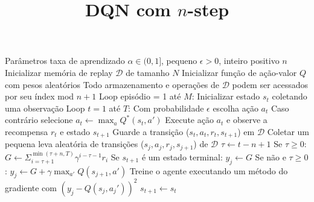 \documentclass[brazilian,preview]{standalone}
\title{DQN com $n$-step}
\begin{document}
\begin{algorithm}
Parâmetros taxa de aprendizado $\alpha  \in (0,1]$, pequeno $\epsilon > 0$, inteiro positivo $n$
Inicializar memória de replay $\mathcal{D}$ de tamanho $N$
Inicializar função de ação-valor $Q$ com pesos aleatórios
Todo armazenamento e operações de $\mathcal{D}$ podem ser acessados por seu índex mod $n+1$
Loop episódio = 1 até $M$:
    Inicializar estado $s_t$ coletando uma observação
    Loop $t = 1$ até $T$:
        Com probabilidade $\epsilon$ escolha ação $a_t$
        Caso contrário selecione $a_t \leftarrow \operatorname{max}_{a} Q^*(s_t, a')$
        Execute ação $a_t$ e observe a recompensa $r_t$ e estado $s_{t+1}$
        Guarde a transição ($s_t,a_t,r_t,s_{t+1}$) em $\mathcal{D}$
        Coletar um pequena leva aleatória de transições ($s_j,a_j,r_j,s_{j+1}$) de $\mathcal{D}$
        $\tau \leftarrow t - n + 1$
        Se $\tau \geq 0$:
            $G \leftarrow \Sigma_{i=\tau+1}^{\operatorname{min}(\tau+n,T)}\gamma^{i-\tau-1}r_i$
        Se $s_{t+1}$ é um estado terminal:
            $y_j \leftarrow G$
        Se não e $\tau \geq 0$:
            $y_j \leftarrow G + \gamma \operatorname{max}_{a'}Q(s_{j+1}, a')$
        Treine o agente executando um método do gradiente com $(y_j - Q(s_j,a_j'))^2$
        $s_{t+1} \leftarrow s_{t}$ 
\end{algorithm}
\end{document}
